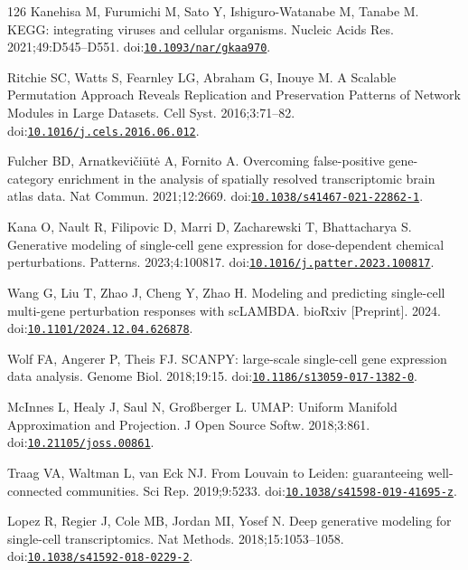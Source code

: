 \begin{thebibliography}{126}
Kanehisa M, Furumichi M, Sato Y, Ishiguro-Watanabe M, Tanabe M. KEGG: integrating viruses and cellular organisms. Nucleic Acids Res. 2021;49:D545--D551. doi:\href{https://doi.org/10.1093/nar/gkaa970}{\nolinkurl{10.1093/nar/gkaa970}}.

Ritchie SC, Watts S, Fearnley LG, Abraham G, Inouye M. A Scalable Permutation Approach Reveals Replication and Preservation Patterns of Network Modules in Large Datasets. Cell Syst. 2016;3:71--82. doi:\href{https://doi.org/10.1016/j.cels.2016.06.012}{\nolinkurl{10.1016/j.cels.2016.06.012}}.

Fulcher BD, Arnatkevičiūtė A, Fornito A. Overcoming false-positive gene-category enrichment in the analysis of spatially resolved transcriptomic brain atlas data. Nat Commun. 2021;12:2669. doi:\href{https://doi.org/10.1038/s41467-021-22862-1}{\nolinkurl{10.1038/s41467-021-22862-1}}.

Kana O, Nault R, Filipovic D, Marri D, Zacharewski T, Bhattacharya S. Generative modeling of single-cell gene expression for dose-dependent chemical perturbations. Patterns. 2023;4:100817. doi:\href{https://doi.org/10.1016/j.patter.2023.100817}{\nolinkurl{10.1016/j.patter.2023.100817}}.

Wang G, Liu T, Zhao J, Cheng Y, Zhao H. Modeling and predicting single-cell multi-gene perturbation responses with scLAMBDA. bioRxiv [Preprint]. 2024. doi:\href{https://doi.org/10.1101/2024.12.04.626878}{\nolinkurl{10.1101/2024.12.04.626878}}.

Wolf FA, Angerer P, Theis FJ. SCANPY: large-scale single-cell gene expression data analysis. Genome Biol. 2018;19:15. doi:\href{https://doi.org/10.1186/s13059-017-1382-0}{\nolinkurl{10.1186/s13059-017-1382-0}}.

McInnes L, Healy J, Saul N, Großberger L. UMAP: Uniform Manifold Approximation and Projection. J Open Source Softw. 2018;3:861. doi:\href{https://doi.org/10.21105/joss.00861}{\nolinkurl{10.21105/joss.00861}}.

Traag VA, Waltman L, van Eck NJ. From Louvain to Leiden: guaranteeing well-connected communities. Sci Rep. 2019;9:5233. doi:\href{https://doi.org/10.1038/s41598-019-41695-z}{\nolinkurl{10.1038/s41598-019-41695-z}}.

Lopez R, Regier J, Cole MB, Jordan MI, Yosef N. Deep generative modeling for single-cell transcriptomics. Nat Methods. 2018;15:1053--1058. doi:\href{https://doi.org/10.1038/s41592-018-0229-2}{\nolinkurl{10.1038/s41592-018-0229-2}}.


\end{thebibliography}
